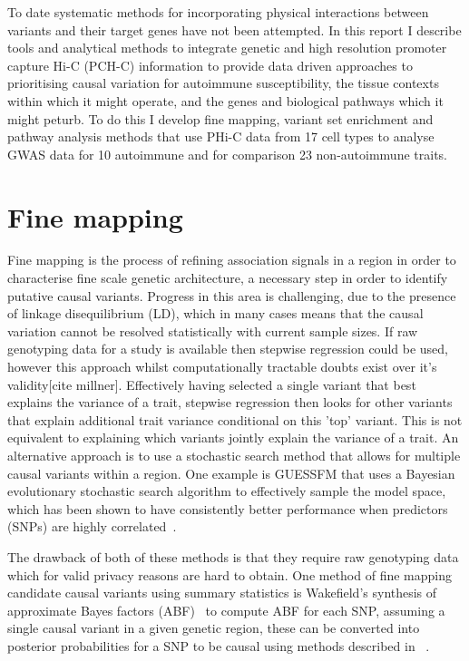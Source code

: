\documentclass[a4paper,11pt]{report}
\begin{document}
To date systematic methods for incorporating physical interactions between variants and their target genes have not been attempted. In this report I describe tools and analytical methods to integrate genetic and high resolution promoter capture Hi-C (PCH-C) information to provide data driven approaches to prioritising causal variation for autoimmune susceptibility, the tissue contexts within which it might operate, and the genes and biological pathways which it might peturb. To do this I develop fine mapping, variant set enrichment and pathway analysis methods that use PHi-C data from 17 cell types to analyse GWAS data for 10 autoimmune and for comparison 23 non-autoimmune traits. 

\section{Fine mapping}

Fine mapping is the process of refining association signals in a region in order to characterise fine scale genetic architecture, a necessary step in order to identify putative causal variants. Progress in this area is challenging, due to the presence of linkage disequilibrium (LD), which in many cases means that the causal variation cannot be resolved statistically with current sample sizes.  If raw genotyping data for a study is available then stepwise regression could be used, however this approach whilst computationally tractable doubts exist over it's validity[cite millner]. Effectively having selected a single variant that best explains the variance of a trait, stepwise regression then looks for other variants that explain additional trait variance conditional on this 'top' variant. This is not equivalent to explaining which variants jointly explain the variance of a trait. An alternative approach is to use a stochastic search method that allows for multiple causal variants within a region. One example is GUESSFM that uses a Bayesian evolutionary stochastic search algorithm to effectively sample the model space, which has been shown to have consistently better performance when predictors (SNPs) are highly correlated~\cite{WallaceCutlerPontikosEtAl2015}. 

The drawback of both of these methods is that they require raw genotyping data  which for valid privacy reasons are hard to obtain. One method of fine mapping candidate causal variants  using summary statistics is Wakefield’s synthesis of approximate Bayes factors (ABF)~\citep{Wakefield2009} to compute ABF for each SNP, assuming a single causal variant in a given genetic region, these can be converted into posterior probabilities for a SNP to be causal using methods described in ~\citet{The_Wellcome_Trust_Case_Control_Consortium2012-ad}. 
\end{document}
